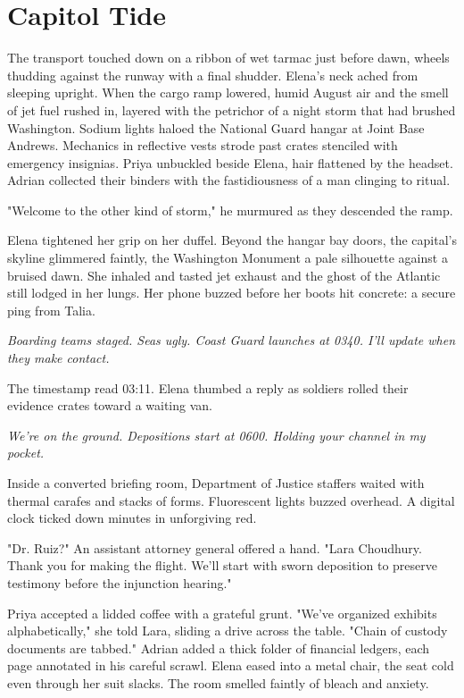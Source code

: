 \chapter{Capitol Tide}

The transport touched down on a ribbon of wet tarmac just before dawn, wheels thudding against the runway with a final shudder. Elena's neck ached from sleeping upright. When the cargo ramp lowered, humid August air and the smell of jet fuel rushed in, layered with the petrichor of a night storm that had brushed Washington. Sodium lights haloed the National Guard hangar at Joint Base Andrews. Mechanics in reflective vests strode past crates stenciled with emergency insignias. Priya unbuckled beside Elena, hair flattened by the headset. Adrian collected their binders with the fastidiousness of a man clinging to ritual.

"Welcome to the other kind of storm," he murmured as they descended the ramp.

Elena tightened her grip on her duffel. Beyond the hangar bay doors, the capital's skyline glimmered faintly, the Washington Monument a pale silhouette against a bruised dawn. She inhaled and tasted jet exhaust and the ghost of the Atlantic still lodged in her lungs. Her phone buzzed before her boots hit concrete: a secure ping from Talia.

\textit{Boarding teams staged. Seas ugly. Coast Guard launches at 0340. I'll update when they make contact.}

The timestamp read 03:11. Elena thumbed a reply as soldiers rolled their evidence crates toward a waiting van.

\textit{We're on the ground. Depositions start at 0600. Holding your channel in my pocket.}

Inside a converted briefing room, Department of Justice staffers waited with thermal carafes and stacks of forms. Fluorescent lights buzzed overhead. A digital clock ticked down minutes in unforgiving red.

"Dr. Ruiz?" An assistant attorney general offered a hand. "Lara Choudhury. Thank you for making the flight. We'll start with sworn deposition to preserve testimony before the injunction hearing."

Priya accepted a lidded coffee with a grateful grunt. "We've organized exhibits alphabetically," she told Lara, sliding a drive across the table. "Chain of custody documents are tabbed." Adrian added a thick folder of financial ledgers, each page annotated in his careful scrawl. Elena eased into a metal chair, the seat cold even through her suit slacks. The room smelled faintly of bleach and anxiety.

